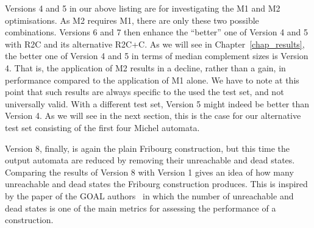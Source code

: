 Versions 4 and 5 in our above listing are for investigating the M1 and M2 optimisations. As M2 requires M1, there are only these two possible combinations. Versions 6 and 7 then enhance the ``better'' one of Version 4 and 5 with R2C and its alternative R2C+C. As we will see in Chapter~\ref{chap_results}, the better one of Version 4 and 5 in terms of median complement sizes is Version 4. That is, the application of M2 results in a decline, rather than a gain, in performance compared to the application of M1 alone. We have to note at this point that such results are always specific to the used the test set, and not universally valid. With a different test set, Version 5 might indeed be better than Version 4. As we will see in the next section, this is the case for our alternative test set consisting of the first four Michel automata.

Version 8, finally, is again the plain Fribourg construction, but this time the output automata are reduced by removing their unreachable and dead states. Comparing the results of Version 8 with Version 1 gives an idea of how many unreachable and dead states the Fribourg construction produces. This is inspired by the paper of the GOAL authors~\cite{2011_tsai} in which the number of unreachable and dead states is one of the main metrics for assessing the performance of a construction.




